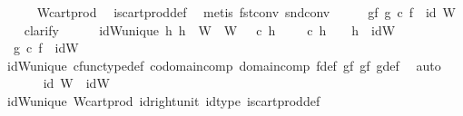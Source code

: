 \begin{isabellebody}
\ \ \ \ \isamarkupfalse%
\ W{\isacharunderscore}{\kern0pt}cart{\isacharunderscore}{\kern0pt}prod\ \isamarkupfalse%
\ is{\isacharunderscore}{\kern0pt}cart{\isacharunderscore}{\kern0pt}prod{\isacharunderscore}{\kern0pt}def\ \isamarkupfalse%
\ {\isacharparenleft}{\kern0pt}metis\ fst{\isacharunderscore}{\kern0pt}conv\ snd{\isacharunderscore}{\kern0pt}conv{\isacharparenright}{\kern0pt}\isanewline
\ \ \isamarkupfalse%
\ \isamarkupfalse%
\ gf{\isacharcolon}{\kern0pt}\ {\isachardoublequoteopen}g\ {\isasymcirc}\isactrlsub c\ f\ {\isacharequal}{\kern0pt}\ id\ W{\isachardoublequoteclose}\isanewline
\ \ \isamarkupfalse%
\ clarify\isanewline
\ \ \ \ \isamarkupfalse%
\ idW{\isacharunderscore}{\kern0pt}unique{\isacharcolon}{\kern0pt}\ {\isachardoublequoteopen}{\isasymforall}h{}{\isachardot}{\kern0pt}\ h{}\ {\isacharcolon}{\kern0pt}\ W\ {\isasymrightarrow}\ W\ {\isasymand}\ {\isasympi}\ {\isasymcirc}\isactrlsub c\ h{}\ {\isacharequal}{\kern0pt}\ {\isasympi}\ {\isasymand}\ {\isasympi}\ {\isasymcirc}\isactrlsub c\ h{}\ {\isacharequal}{\kern0pt}\ {\isasympi}\ {\isasymlongrightarrow}\ h{}\ {\isacharequal}{\kern0pt}\ idW{\isachardoublequoteclose}\isanewline
\ \ \ \ \isamarkupfalse%
\ {}{\isacharcolon}{\kern0pt}\ {\isachardoublequoteopen}g\ {\isasymcirc}\isactrlsub c\ f\ {\isacharequal}{\kern0pt}\ idW{\isachardoublequoteclose}\isanewline
\ \ \ \ \ \ \isamarkupfalse%
\ idW{\isacharunderscore}{\kern0pt}unique\ cfunc{\isacharunderscore}{\kern0pt}type{\isacharunderscore}{\kern0pt}def\ codomain{\isacharunderscore}{\kern0pt}comp\ domain{\isacharunderscore}{\kern0pt}comp\ f{\isacharunderscore}{\kern0pt}def\ gf{}\ gf{}\ g{\isacharunderscore}{\kern0pt}def\ \isamarkupfalse%
\ auto\isanewline
\ \ \ \ \isamarkupfalse%
\ {}{\isacharcolon}{\kern0pt}\ {\isachardoublequoteopen}id\ W\ {\isacharequal}{\kern0pt}\ idW{\isachardoublequoteclose}\isanewline
\ \ \ \ \ \ \isamarkupfalse%
\ idW{\isacharunderscore}{\kern0pt}unique\ W{\isacharunderscore}{\kern0pt}cart{\isacharunderscore}{\kern0pt}prod\ id{\isacharunderscore}{\kern0pt}right{\isacharunderscore}{\kern0pt}unit{}\ id{\isacharunderscore}{\kern0pt}type\ is{\isacharunderscore}{\kern0pt}cart{\isacharunderscore}{\kern0pt}prod{\isacharunderscore}{\kern0pt}def\ \isamarkupfalse%

\end{isabellebody}
